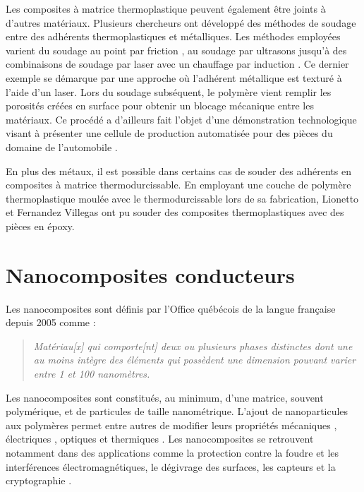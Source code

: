 Les composites à matrice thermoplastique peuvent également être joints à d'autres matériaux. 
Plusieurs chercheurs ont développé des méthodes de soudage entre des adhérents thermoplastiques et métalliques. 
Les méthodes employées varient du soudage au point par friction \cite{Goushegir2016}, au soudage par ultrasons \cite{Balle2009,Kruger2004} jusqu'à des combinaisons de soudage par laser avec un chauffage par induction \cite{Weidmann2018}. 
Ce dernier exemple se démarque par une approche où l'adhérent métallique est texturé à l'aide d'un laser. 
Lors du soudage subséquent, le polymère vient remplir les porosités créées en surface pour obtenir un blocage mécanique entre les matériaux. 
Ce procédé a d'ailleurs fait l'objet d'une démonstration technologique visant à présenter une cellule de production automatisée pour des pièces du domaine de l'automobile \cite{Gardiner2019a}. 

En plus des métaux, il est possible dans certains cas de souder des adhérents en composites à matrice thermodurcissable. 
En employant une couche de polymère thermoplastique moulée avec le thermodurcissable lors de sa fabrication, Lionetto \cite{Lionetto2018a} et Fernandez Villegas \cite{FernandezVillegas2015} ont pu souder des composites thermoplastiques avec des pièces en époxy.

\section{Nanocomposites conducteurs}

Les nanocomposites sont définis par l'Office québécois de la langue française depuis 2005 comme : 

\begin{quote}
	\textit{Matériau[x] qui comporte[nt] deux ou plusieurs phases distinctes dont une au moins intègre des éléments qui possèdent une dimension pouvant varier entre 1 et 100 nanomètres.}
\end{quote}

Les nanocomposites sont constitués, au minimum, d'une matrice, souvent polymérique, et de particules de taille nanométrique. 
L'ajout de nanoparticules aux polymères permet entre autres de modifier leurs propriétés mécaniques \cite{Thostenson2002a}, électriques \cite{Zheng2003a}, optiques \cite{Hu2014} et thermiques \cite{Diez-Pascual2009, Al-Saleh2009c}. 
Les nanocomposites se retrouvent notamment dans des applications comme la protection contre la foudre et les interférences électromagnétiques, le dégivrage des surfaces, les capteurs et la cryptographie \cite{Andrews2001, Thostenson2001c, Mittal2014h, Gaztelumendi2017, Chu2014, Hu2016, Al-Saleh2009, Chopra2003}. 

